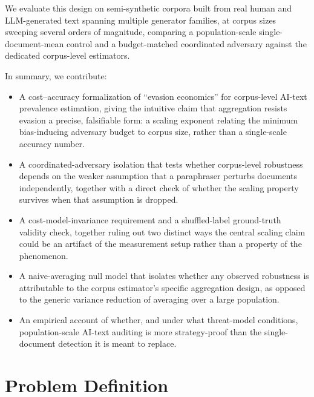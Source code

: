 \documentclass[11pt]{article}
\begin{document}
We evaluate this design on semi-synthetic corpora built from real human and LLM-generated text spanning multiple generator families, at corpus sizes sweeping several orders of magnitude, comparing a population-scale single-document-mean control and a budget-matched coordinated adversary against the dedicated corpus-level estimators.

In summary, we contribute:
\begin{itemize}[leftmargin=1.4em]
\item A cost--accuracy formalization of ``evasion economics'' for corpus-level AI-text prevalence estimation, giving the intuitive claim that aggregation resists evasion a precise, falsifiable form: a scaling exponent relating the minimum bias-inducing adversary budget to corpus size, rather than a single-scale accuracy number.
\item A coordinated-adversary isolation that tests whether corpus-level robustness depends on the weaker assumption that a paraphraser perturbs documents independently, together with a direct check of whether the scaling property survives when that assumption is dropped.
\item A cost-model-invariance requirement and a shuffled-label ground-truth validity check, together ruling out two distinct ways the central scaling claim could be an artifact of the measurement setup rather than a property of the phenomenon.
\item A naive-averaging null model that isolates whether any observed robustness is attributable to the corpus estimator's specific aggregation design, as opposed to the generic variance reduction of averaging over a large population.
\item An empirical account of whether, and under what threat-model conditions, population-scale AI-text auditing is more strategy-proof than the single-document detection it is meant to replace.
\end{itemize}

\section{Problem Definition}
\end{document}
